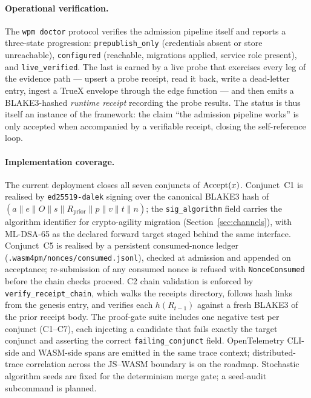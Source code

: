 \paragraph{Operational verification.} The \texttt{wpm doctor} protocol
verifies the admission pipeline itself and reports a three-state progression:
\texttt{prepublish\_only} (credentials absent or store unreachable),
\texttt{configured} (reachable, migrations applied, service role present), and
\texttt{live\_verified}. The last is earned by a live probe that exercises
every leg of the evidence path --- upsert a probe receipt, read it back, write
a dead-letter entry, ingest a TrueX envelope through the edge function --- and
then emits a BLAKE3-hashed \emph{runtime receipt} recording the probe results.
The status is thus itself an instance of the framework: the claim ``the
admission pipeline works'' is only accepted when accompanied by a verifiable
receipt, closing the self-reference loop.

\paragraph{Implementation coverage.} The current deployment closes all seven conjuncts of
$\operatorname{Accept}(x)$. Conjunct~C1 is realised by \texttt{ed25519-dalek} signing over the canonical
BLAKE3 hash of $(a \| e \| O \| s \| R_{\mathrm{prior}} \| p \| v \| t \| n)$; the
\texttt{sig\_algorithm} field carries the algorithm identifier for crypto-agility migration
(Section~\ref{sec:channels}), with ML-DSA-65 as the declared forward target staged behind the
same interface. Conjunct~C5 is realised by a persistent consumed-nonce ledger
(\texttt{.wasm4pm/nonces/consumed.jsonl}), checked at admission and appended on acceptance;
re-submission of any consumed nonce is refused with \texttt{NonceConsumed} before the chain
checks proceed. C2 chain validation is enforced by \texttt{verify\_receipt\_chain}, which
walks the receipts directory, follows hash links from the genesis entry, and verifies each
$h(R_{t-1})$ against a fresh BLAKE3 of the prior receipt body. The proof-gate suite includes
one negative test per conjunct (C1--C7), each injecting a candidate that fails exactly the
target conjunct and asserting the correct \texttt{failing\_conjunct} field. OpenTelemetry
CLI-side and WASM-side spans are emitted in the same trace context; distributed-trace
correlation across the JS--WASM boundary is on the roadmap. Stochastic algorithm seeds are
fixed for the determinism merge gate; a seed-audit subcommand is planned.
